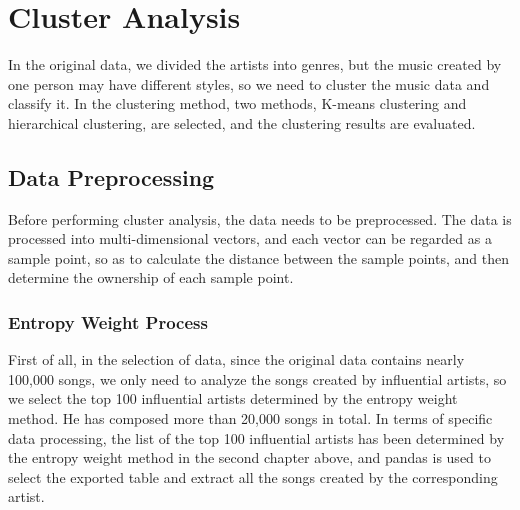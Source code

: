 
\chapter{Cluster Analysis}

In the original data, we divided the artists into genres, but the music created by one person may have different styles, so we need to cluster the music data and classify it. In the clustering method, two methods, K-means clustering and hierarchical clustering, are selected, and the clustering results are evaluated.

\section{Data Preprocessing}
Before performing cluster analysis, the data needs to be preprocessed. The data is processed into multi-dimensional vectors, and each vector can be regarded as a sample point, so as to calculate the distance between the sample points, and then determine the ownership of each sample point.
\subsection{Entropy Weight Process}
First of all, in the selection of data, since the original data contains nearly 100,000 songs, we only need to analyze the songs created by influential artists, so we select the top 100 influential artists determined by the entropy weight method. He has composed more than 20,000 songs in total.
In terms of specific data processing, the list of the top 100 influential artists has been determined by the entropy weight method in the second chapter above, and pandas is used to select the exported table and extract all the songs created by the corresponding artist.

